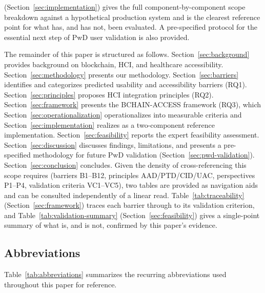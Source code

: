 \documentclass[journal,onecolumn]{IEEEtran}
\begin{document}
(Section~\ref{sec:implementation}) gives the full component-by-component scope breakdown against a hypothetical production system and is the clearest reference point for what has, and has not, been evaluated. A pre-specified protocol for the essential next step of PwD user validation is also provided.

The remainder of this paper is structured as follows. Section~\ref{sec:background} provides background on blockchain, HCI, and healthcare accessibility. Section~\ref{sec:methodology} presents our methodology. Section~\ref{sec:barriers} identifies and categorizes predicted usability and accessibility barriers (RQ1). Section~\ref{sec:principles} proposes HCI integration principles (RQ2). Section~\ref{sec:framework} presents the BCHAIN-ACCESS framework (RQ3), which Section~\ref{sec:operationalization} operationalizes into measurable criteria and Section~\ref{sec:implementation} realizes as a two-component reference implementation. Section~\ref{sec:feasibility} reports the expert feasibility assessment. Section~\ref{sec:discussion} discusses findings, limitations, and presents a pre-specified methodology for future PwD validation (Section~\ref{sec:pwd-validation}). Section~\ref{sec:conclusion} concludes. Given the density of cross-referencing this scope requires (barriers B1--B12, principles AAD/PTD/CID/UAC, perspectives P1--P4, validation criteria VC1--VC5), two tables are provided as navigation aids and can be consulted independently of a linear read. Table~\ref{tab:traceability} (Section~\ref{sec:framework}) traces each barrier through to its validation criterion, and Table~\ref{tab:validation-summary} (Section~\ref{sec:feasibility}) gives a single-point summary of what is, and is not, confirmed by this paper's evidence.

\subsection{Abbreviations}
Table~\ref{tab:abbreviations} summarizes the recurring abbreviations used throughout this paper for reference.
\end{document}

